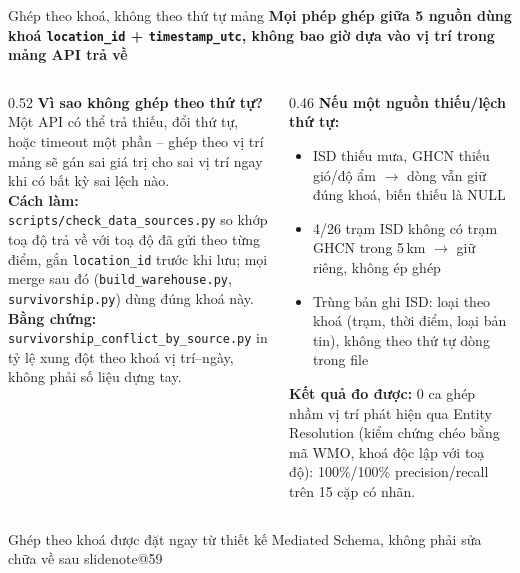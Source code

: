 \documentclass[t,aspectratio=169,12pt]{beamer}
\makeatletter
\newcommand{\slidenote}[1]{\ifcsname slidenote@#1\endcsname\note{\csname slidenote@#1\endcsname}\fi}
\newcommand{\ketluan}[1]{\vskip2mm{\color{hustred}#1}}
\newcommand{\ychinh}[1]{\vskip1mm{\bfseries #1}\par\vskip1mm}
\makeatother
\begin{document}
\begin{frame}{Ghép theo khoá, không theo thứ tự mảng}
  \ychinh{\small Mọi phép ghép giữa 5 nguồn dùng khoá \texttt{location\_id} + \texttt{timestamp\_utc}, không
    bao giờ dựa vào vị trí trong mảng API trả về}
  \begin{columns}[T]
    \begin{column}{0.52\textwidth}
      \scriptsize
      \textbf{Vì sao không ghép theo thứ tự?} Một API có thể trả thiếu, đổi thứ tự, hoặc timeout một phần --
      ghép theo vị trí mảng sẽ gán sai giá trị cho sai vị trí ngay khi có bất kỳ sai lệch nào.\\[1.5mm]
      \textbf{Cách làm:} \texttt{scripts/check\_data\_sources.py} so khớp toạ độ trả về với toạ độ đã gửi theo
      từng điểm, gắn \texttt{location\_id} trước khi lưu; mọi merge sau đó
      (\texttt{build\_warehouse.py}, \texttt{survivorship.py}) dùng đúng khoá này.\\[1.5mm]
      \textbf{Bằng chứng:} \texttt{survivorship\_conflict\_by\_source.py} in tỷ lệ xung đột theo khoá
      vị trí--ngày, không phải số liệu dựng tay.
    \end{column}
    \begin{column}{0.46\textwidth}
      \scriptsize
      \textbf{Nếu một nguồn thiếu/lệch thứ tự:}
      \begin{itemize}\scriptsize\setlength\itemsep{0.6mm}
        \item ISD thiếu mưa, GHCN thiếu gió/độ ẩm $\to$ dòng vẫn giữ đúng khoá, biến thiếu là NULL
        \item 4/26 trạm ISD không có trạm GHCN trong 5\,km $\to$ giữ riêng, không ép ghép
        \item Trùng bản ghi ISD: loại theo khoá (trạm, thời điểm, loại bản tin), không theo thứ tự dòng trong file
      \end{itemize}
      \vskip1mm
      \textbf{Kết quả đo được:} 0 ca ghép nhầm vị trí phát hiện qua Entity Resolution (kiểm chứng chéo bằng
      mã WMO, khoá độc lập với toạ độ): 100\%/100\% precision/recall trên 15 cặp có nhãn.
    \end{column}
  \end{columns}
  \ketluan{\scriptsize Ghép theo khoá được đặt ngay từ thiết kế Mediated Schema, không phải sửa chữa về sau}
  \slidenote{59}
\end{frame}
\end{document}
